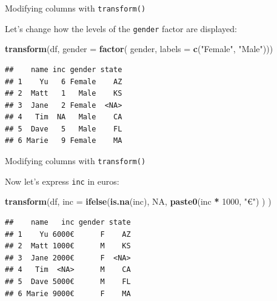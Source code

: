 \documentclass[ignorenonframetext,]{beamer}
\newenvironment{Shaded}{\begin{snugshade}}{\end{snugshade}}
\newcommand{\DataTypeTok}[1]{\textcolor[rgb]{0.13,0.29,0.53}{#1}}
\newcommand{\DecValTok}[1]{\textcolor[rgb]{0.00,0.00,0.81}{#1}}
\newcommand{\KeywordTok}[1]{\textcolor[rgb]{0.13,0.29,0.53}{\textbf{#1}}}
\newcommand{\NormalTok}[1]{#1}
\newcommand{\OperatorTok}[1]{\textcolor[rgb]{0.81,0.36,0.00}{\textbf{#1}}}
\newcommand{\OtherTok}[1]{\textcolor[rgb]{0.56,0.35,0.01}{#1}}
\newcommand{\StringTok}[1]{\textcolor[rgb]{0.31,0.60,0.02}{#1}}
\begin{document}
\begin{frame}[fragile]{Modifying columns with \texttt{transform()}}
\protect\hypertarget{modifying-columns-with-transform-1}{}

Let's change how the levels of the \texttt{gender} factor are displayed:

\begin{Shaded}
\begin{Highlighting}[]
\KeywordTok{transform}\NormalTok{(df, }\DataTypeTok{gender =} \KeywordTok{factor}\NormalTok{(}
\NormalTok{  gender, }\DataTypeTok{labels =} \KeywordTok{c}\NormalTok{(}\StringTok{"Female"}\NormalTok{, }\StringTok{"Male"}\NormalTok{)))}
\end{Highlighting}
\end{Shaded}

\begin{verbatim}
##    name inc gender state
## 1    Yu   6 Female    AZ
## 2  Matt   1   Male    KS
## 3  Jane   2 Female  <NA>
## 4   Tim  NA   Male    CA
## 5  Dave   5   Male    FL
## 6 Marie   9 Female    MA
\end{verbatim}

\end{frame}

\begin{frame}[fragile]{Modifying columns with \texttt{transform()}}
\protect\hypertarget{modifying-columns-with-transform-2}{}

Now let's express \texttt{inc} in euros:

\begin{Shaded}
\begin{Highlighting}[]
\KeywordTok{transform}\NormalTok{(df, }\DataTypeTok{inc =} \KeywordTok{ifelse}\NormalTok{(}\KeywordTok{is.na}\NormalTok{(inc), }\OtherTok{NA}\NormalTok{, }
                           \KeywordTok{paste0}\NormalTok{(inc }\OperatorTok{*}\StringTok{ }\DecValTok{1000}\NormalTok{, }\StringTok{"€"}\NormalTok{)}
\NormalTok{                           )}
\NormalTok{          )}
\end{Highlighting}
\end{Shaded}

\begin{verbatim}
##    name   inc gender state
## 1    Yu 6000€      F    AZ
## 2  Matt 1000€      M    KS
## 3  Jane 2000€      F  <NA>
## 4   Tim  <NA>      M    CA
## 5  Dave 5000€      M    FL
## 6 Marie 9000€      F    MA
\end{verbatim}

\end{frame}
\end{document}
